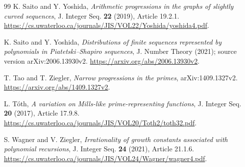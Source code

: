 \documentclass[11pt,a4paper]{article}
\theoremstyle{definition}
\theoremstyle{remark}
\numberwithin{equation}{section}
\begin{document}
\begin{thebibliography}{99}
K. Saito and Y. Yoshida, \emph{Arithmetic progressions in the graphs of slightly curved sequences},
J. Integer Seq. \textbf{22} (2019), Article 19.2.1.
\url{https://cs.uwaterloo.ca/journals/JIS/VOL22/Yoshida/yoshida4.pdf}.

K. Saito and Y. Yoshida, \emph{Distributions of finite sequences represented by polynomials in Piatetski--Shapiro sequences},
J. Number Theory (2021); source version arXiv:2006.13930v2.
\url{https://arxiv.org/abs/2006.13930v2}.

T. Tao and T. Ziegler, \emph{Narrow progressions in the primes}, arXiv:1409.1327v2.
\url{https://arxiv.org/abs/1409.1327v2}.

L. T\'oth, \emph{A variation on Mills-like prime-representing functions},
J. Integer Seq. \textbf{20} (2017), Article 17.9.8.
\url{https://cs.uwaterloo.ca/journals/JIS/VOL20/Toth2/toth32.pdf}.

S. Wagner and V. Ziegler,
\emph{Irrationality of growth constants associated with polynomial recursions},
J. Integer Seq. \textbf{24} (2021), Article 21.1.6.
\url{https://cs.uwaterloo.ca/journals/JIS/VOL24/Wagner/wagner4.pdf}.
\end{thebibliography}
\endgroup
\end{document}

